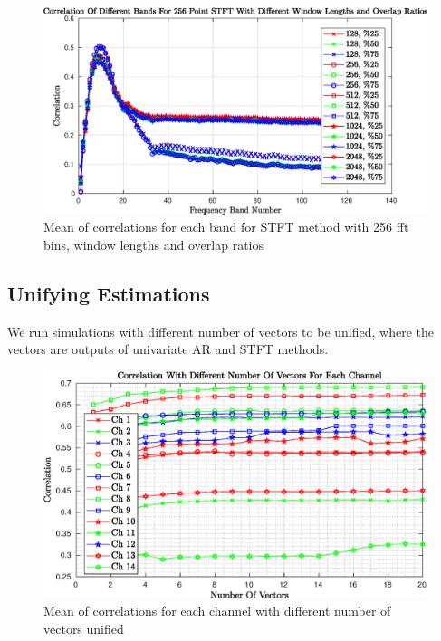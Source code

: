 \begin{figure}[h!]
	\begin{center}
		\includegraphics[width=\textwidth]{figures/corr_normal_for_stft_256.eps}
		\caption{Mean of correlations for each band for STFT method with 256 fft bins, window lengths and overlap ratios}
		\label{fig:airflow_stft_256}
	\end{center}
\end{figure}

\subsection{Unifying Estimations}
We run simulations with different number of vectors to be unified, where the vectors are outputs of univariate AR and STFT methods.
\begin{figure}[h!]
	\begin{center}
		\includegraphics[width=\textwidth]{figures/corr_normal_unify.eps}
		\caption{Mean of correlations for each channel with different number of vectors unified}
		\label{fig:airflow_unify}
	\end{center}
\end{figure}
       

